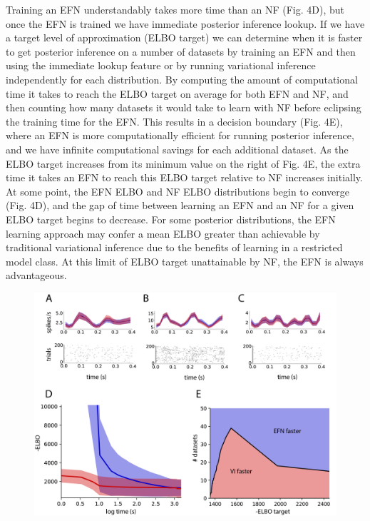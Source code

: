 \documentclass[twoside]{article}
\begin{document}
Training an EFN understandably takes more time than an NF (Fig. 4D), but once the EFN is trained we have immediate posterior inference lookup.  If we have a target level of approximation (ELBO target) we can determine when it is faster to get posterior inference on a number of datasets by training an EFN and then using the immediate lookup feature or by running variational inference independently for each distribution.  By computing the amount of computational time it takes to reach the ELBO target on average for both EFN and NF, and then counting how many datasets it would take to learn with NF before eclipsing the training time for the EFN.  This results in a decision boundary (Fig. 4E), where an EFN is more computationally efficient for running posterior inference, and we have infinite computational savings for each additional dataset.  As the ELBO target increases from its minimum value on the right of Fig. 4E, the extra time it takes an EFN to reach this ELBO target relative to NF increases initially.  At some point, the EFN ELBO and NF ELBO distributions begin to converge (Fig. 4D), and the gap of time between learning an EFN and an NF for a given ELBO target begins to decrease.  For some posterior distributions, the EFN learning approach may confer a mean ELBO greater than achievable by traditional variational inference due to the benefits of learning in a restricted model class.  At this limit of ELBO target unattainable by NF, the EFN is always advantageous.

\begin{figure}
\centering
\includegraphics[width=1.0\linewidth]{figs/fig4/fig4.png}
\label{fig:test1}
\end{figure}
\end{document}
